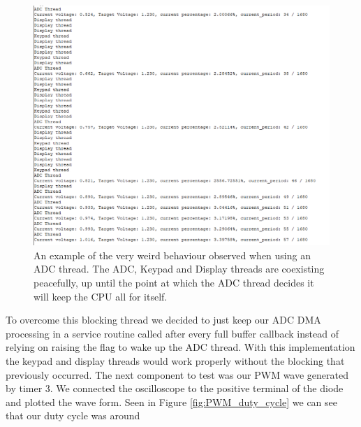\begin{figure}[h]
\centering
\includegraphics[scale=0.5]{images/weird_behaviour.png}
\caption{
\label{fig:weird_behaviour}
An example of the very weird behaviour observed when using an ADC thread. The ADC, Keypad and Display threads are coexisting peacefully, up until the point at which the ADC thread decides it will keep the CPU all for itself.
}
\end{figure}





To overcome this blocking thread we decided to just keep our ADC DMA processing in a service routine called after every full buffer callback instead of relying on raising the flag to wake up the ADC thread. With this implementation the keypad and display threads would work properly without the blocking that previously occurred.
The next component to test was our PWM wave generated by timer 3. We connected the oscilloscope to the positive terminal of the diode and plotted the wave form. Seen in Figure \ref{fig:PWM_duty_cycle} we can see that our duty cycle was around %

